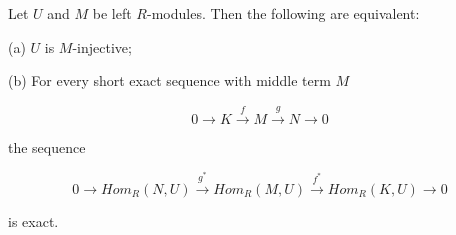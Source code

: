 Let $U$ and $M$ be left $R$-modules. Then the following are equivalent:

(a) $U$ is $M$-injective;

(b) For every short exact sequence with middle term $M$

$$0 \to K \xrightarrow{f} M \xrightarrow{g} N \to 0$$

the sequence

$$0 \to Hom_R(N, U) \xrightarrow{g^*} Hom_R(M, U) \xrightarrow{f^*} Hom_R(K, U) \to 0$$

is exact.

